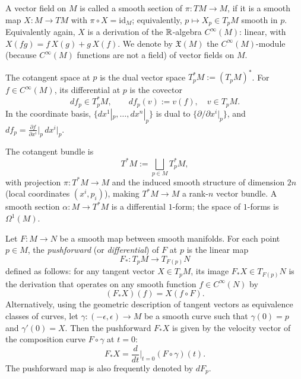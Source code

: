 \begin{definition}\label{def:vector-field}
	A vector field on $M$ is called a smooth section of $\pi: TM \to M$, if it is a smooth map $X: M \to TM$ with $\pi \circ X = \mathrm{id}_M$; equivalently, $p \mapsto X_p \in T_pM$ smooth in $p$. Equivalently again, $X$ is a derivation of the $\mathbb{R}$-algebra $C^\infty(M)$: linear, with $X(fg) = f\,X(g) + g\,X(f)$. We denote by $\mathfrak{X}(M)$ the $C^\infty(M)$-module (because $C^\infty(M)$ functions are not a field) of vector fields on $M$.
\end{definition}

\begin{definition}\label{def:cot-space}
	The cotangent space at $p$ is the dual vector space $T_p^*M := (T_pM)^*$. For $f \in C^\infty(M)$, its differential at $p$ is the covector
	\[
	df_p \in T_p^*M, \qquad df_p(v) := v(f), \quad v \in T_pM.
	\]
	In the coordinate basis, $\{dx^1|_p,\dots,dx^n|_p\}$ is dual to $\{\partial/\partial x^i|_p\}$, and $df_p = \frac{\partial f}{\partial x^i}\Big|_p\, dx^i|_p$.
\end{definition}

\begin{definition}\label{def:cot-bundle}
	The cotangent bundle is
	\[
	T^*M := \bigsqcup_{p \in M} T_p^*M,
	\]
	with projection $\pi: T^*M \to M$ and the induced smooth structure of dimension $2n$ (local coordinates $(x^i,p_i)$), making $T^*M \to M$ a rank-$n$ vector bundle. A smooth section $\alpha: M \to T^*M$ is a differential $1$-form; the space of $1$-forms is $\Omega^1(M)$.
\end{definition}

\begin{definition}\label{def:pushforward}
	Let $F: M \to N$ be a smooth map between smooth manifolds. For each point $p \in M$, the \textit{pushforward} (or \textit{differential}) of $F$ at $p$ is the linear map 
	\[
	F_*: T_pM \to T_{F(p)}N
	\]
	defined as follows: for any tangent vector $X \in T_pM$, its image $F_*X \in T_{F(p)}N$ is the derivation that operates on any smooth function $f \in C^\infty(N)$ by
	\[
	(F_*X)(f) = X(f \circ F).
	\]
	Alternatively, using the geometric description of tangent vectors as equivalence classes of curves, let $\gamma: (-\epsilon, \epsilon) \to M$ be a smooth curve such that $\gamma(0) = p$ and $\gamma'(0) = X$. Then the pushforward $F_*X$ is given by the velocity vector of the composition curve $F \circ \gamma$ at $t = 0$:
	\[
	F_*X = \frac{d}{dt}\Big|_{t=0} (F \circ \gamma)(t).
	\]
	The pushforward map is also frequently denoted by $dF_p$.
\end{definition}

